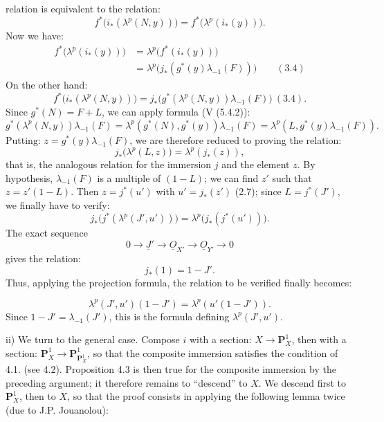 %
relation is equivalent to the relation:
\[
  f^*\bigl(i_*(\lambda^p(N,y))\bigr)=
  f^*\bigl(\lambda^p(i_*(y))\bigr).
\]
Now we have:
\[
\begin{aligned}
 f^*\bigl(\lambda^p(i_*(y))\bigr)
 &=\lambda^p\bigl(f^*(i_*(y))\bigr)\\
 &=\lambda^p\bigl(j_*(g^*(y)\lambda_{-1}(F))\bigr)
\qquad(3.4)
\end{aligned}
\]
On the other hand:
\[
  f^*\bigl(i_*(\lambda^p(N,y))\bigr)
  =
  j_*\bigl(g^*(\lambda^p(N,y))\lambda_{-1}(F)\bigr)\ (3.4).
\]
Since \(g^*(N)=F+L\), we can apply formula (V (5.4.2)):
\[
  g^*(\lambda^p(N,y))\lambda_{-1}(F)
  =
  \lambda^p(g^*(N),g^*(y))\lambda_{-1}(F)
  =
  \lambda^p(L,g^*(y)\lambda_{-1}(F)).
\]
Putting: \(z=g^*(y)\lambda_{-1}(F)\), we are therefore reduced to proving the relation:
\[
  j_*\bigl(\lambda^p(L,z)\bigr)=\lambda^p(j_*(z)),
\]
that is, the analogous relation for the immersion \(j\) and the element \(z\). By hypothesis, \(\lambda_{-1}(F)\) is a multiple of \((1-L)\); we can find \(z'\) such that \(z=z'(1-L)\). Then \(z=j^*(u')\) with \(u'=j_*(z')\) (2.7); since \(L=j^*(J')\), we finally have to verify:
\[
  j_*\bigl(j^*(\lambda^p(J',u'))\bigr)=
  \lambda^p\bigl(j_*(j^*(u'))\bigr).
\]
The exact sequence
\[
  0\longrightarrow \underline{J}'\longrightarrow \underline{O}_{X'}
  \longrightarrow \underline{O}_{Y'}\longrightarrow 0
\]
gives the relation:
\begin{equation}\tag{4.3.2}
  j_*(1)=1-J'.
\end{equation}
Thus, applying the projection formula, the relation to be verified finally becomes:

%
\[
  \lambda^p(J',u')(1-J')=\lambda^p(u'(1-J')).
\]
Since \(1-J'=\lambda_{-1}(J')\), this is the formula defining \(\lambda^p(J',u')\).

ii) We turn to the general case. Compose \(i\) with a section: \(X\to\mathbf P_X^1\), then with a section: \(\mathbf P_X^1\to\mathbf P_{\mathbf P_X^1}^1\), so that the composite immersion satisfies the condition of 4.1. (see 4.2). Proposition 4.3 is then true for the composite immersion by the preceding argument; it therefore remains to ``descend'' to \(X\). We descend first to \(\mathbf P_X^1\), then to \(X\), so that the proof consists in applying the following lemma twice (due to J.P. Jouanolou):

